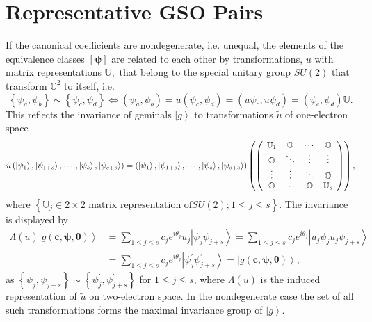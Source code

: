 \documentclass[aps,preprint]{revtex4}%
\begin{document}
\section{Representative GSO Pairs\label{GSOpairs}}

If the canonical coefficients are nondegenerate, i.e. unequal, the elements of
the equivalence classes $\left[  \boldsymbol{\psi}\right]  $ are related to
each other by transformations, $u$ with matrix representations $\mathbb{U},$
that belong to the special unitary group $SU\left(  2\right)  $ that transform
$\mathbb{C}^{2}$ to itself, i.e.%
\begin{equation}
\left\{  \psi_{a},\psi_{b}\right\}  \sim\left\{  \psi_{c},\psi_{d}\right\}
\Leftrightarrow\left(  \psi_{a},\psi_{b}\right)  =u\left(  \psi_{c},\psi
_{d}\right)  =\left(  u\psi_{c},u\psi_{d}\right)  =\left(  \psi_{c},\psi
_{d}\right)  \mathbb{U}. \label{NonDegEq}%
\end{equation}
This reflects the invariance of geminals $\left\vert g\right\rangle $ to
transformations $\tilde{u}$ of one-electron space
\begin{equation}
\tilde{u}\left(  \left\vert \psi_{1}\right\rangle ,\left\vert \psi
_{1+s}\right\rangle ,\cdots,\left\vert \psi_{s}\right\rangle ,\left\vert
\psi_{s+s}\right\rangle \right)  =\left(  \left\vert \psi_{1}\right\rangle
,\left\vert \psi_{1+s}\right\rangle ,\cdots,\left\vert \psi_{s}\right\rangle
,\left\vert \psi_{s+s}\right\rangle \right)  \left(  \left(
\begin{array}
[c]{cccc}%
\mathbb{U}_{1} & \mathbb{O} & \cdots & \mathbb{O}\\
\mathbb{O} & \ddots & \vdots & \vdots\\
\vdots & \vdots & \ddots & \mathbb{O}\\
\mathbb{O} & \cdots & \mathbb{O} & \mathbb{U}_{s}%
\end{array}
\right)  \right)  ,
\end{equation}
where $\left\{  \mathbb{U}_{j}\in2\times2\text{ matrix representation of
}SU\left(  2\right)  ;1\leq j\leq s\right\}  .$ The invariance is displayed
by
\begin{align}
\Lambda\left(  \tilde{u}\right)  \left\vert g\left(  \boldsymbol{c}%
,\boldsymbol{\psi},\boldsymbol{\theta}\right)  \right\rangle  &  =\sum_{1\leq
j\leq s}c_{j}e^{i\theta_{j}}u_{j}\left\vert \psi_{j}\psi_{j+s}\right\rangle
=\sum_{1\leq j\leq s}c_{j}e^{i\theta_{j}}\left\vert u_{j}\psi_{j}u_{j}%
\psi_{j+s}\right\rangle \nonumber\\
&  =\sum_{1\leq j\leq s}c_{j}e^{i\theta_{j}}\left\vert \psi_{j}^{\prime}%
\psi_{j+s}^{\prime}\right\rangle =\left\vert g\left(  \boldsymbol{c}%
,\boldsymbol{\psi},\boldsymbol{\theta}\right)  \right\rangle ,
\end{align}
as $\left\{  \psi_{j},\psi_{j+s}\right\}  \sim\left\{  \psi_{j}^{\prime}%
,\psi_{j+s}^{\prime}\right\}  $ for $1\leq j\leq s$, where $\Lambda\left(
\tilde{u}\right)  $ is the induced representation of $\tilde{u}$ on
two-electron space. In the nondegenerate case the set of all such
transformations forms the maximal invariance group of $\left\vert
g\right\rangle .$
\end{document}
